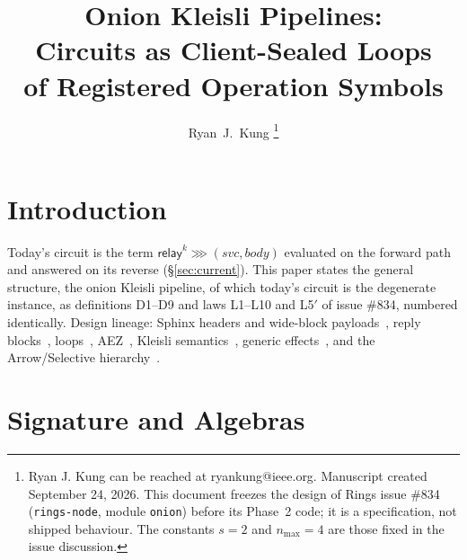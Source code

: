 \documentclass[journal]{IEEEtran}
\author{Ryan~J.~Kung%
\thanks{Ryan J. Kung can be reached at ryankung@ieee.org.
Manuscript created September 24, 2026.  This document freezes the design
of Rings issue \#834 (\texttt{rings-node}, module \texttt{onion}) before
its Phase~2 code; it is a specification, not shipped behaviour.  The
constants $s=2$ and $n_{\max}=4$ are those fixed in the issue discussion.}}
\title{\huge Onion Kleisli Pipelines:\\
Circuits as Client-Sealed Loops\\
of Registered Operation Symbols}
\date{}
\newcommand{\then}{\mathbin{\ggg}}
\newcommand{\relay}{\mathsf{relay}}
\begin{document}
\maketitle

\section{Introduction}

Today's circuit is the term $\relay^{k}\then(\mathit{svc},\mathit{body})$
evaluated on the forward path and answered on its reverse
(\S\ref{sec:current}).  This paper states the general structure, the
onion Kleisli pipeline, of which today's circuit is the degenerate
instance, as definitions D1--D9 and laws L1--L10 and L5$'$ of issue \#834,
numbered identically.  Design lineage: Sphinx headers and
wide-block payloads~\cite{Danezis2009}, reply blocks~\cite{Chaum1981,
Danezis2003}, loops~\cite{Piotrowska2017}, AEZ~\cite{Hoang2015}, Kleisli
semantics~\cite{Moggi1991}, generic effects~\cite{Plotkin2003,
Plotkin2009}, and the Arrow/Selective hierarchy~\cite{Hughes2000,
Lindley2011,Mokhov2019}.

\section{Signature and Algebras}\label{sec:sig}
\end{document}

